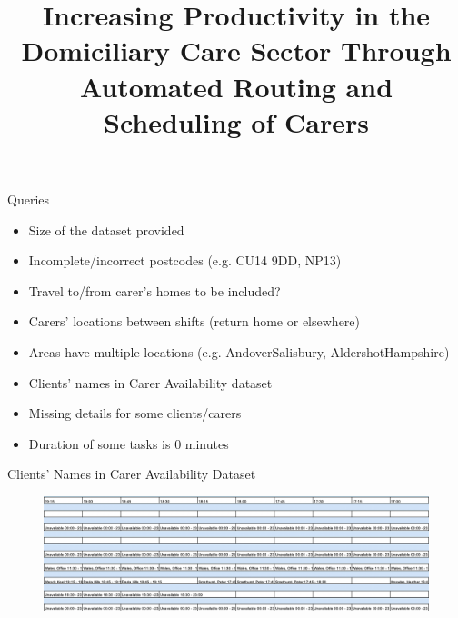 \documentclass[usenames,dvipsnames]{beamer}
\begin{document}
\title{Increasing Productivity in the Domiciliary Care Sector Through Automated Routing and Scheduling of Carers}
\date{}
\maketitle



\begin{frame}{Queries}
	\scriptsize
	\begin{itemize}
		\item Size of the dataset provided
		\item Incomplete/incorrect postcodes (e.g. CU14 9DD, NP13)
		\item Travel to/from carer's homes to be included?
		\item Carers' locations between shifts (return home or elsewhere)
		\item Areas have multiple locations (e.g. AndoverSalisbury, AldershotHampshire)
		\item Clients' names in Carer Availability dataset
		\item Missing details for some clients/carers
		\item Duration of some tasks is 0 minutes
	\end{itemize}	
\end{frame}

\begin{frame}{Clients' Names in Carer Availability Dataset}
	\begin{figure}
		\includegraphics[width=1\linewidth]{figures/ClientNames}%
	\end{figure}
\end{frame}
\end{document}
